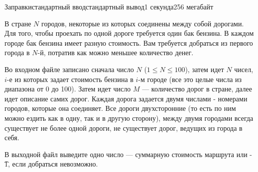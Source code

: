 \begin{problem}{Заправки}{стандартный ввод}{стандартный вывод}{1 секунда}{256 мегабайт}

В стране $N$ городов, некоторые из которых соединены между собой дорогами. Для того, чтобы проехать по одной дороге требуется один бак бензина. В каждом городе бак бензина имеет разную стоимость. Вам требуется добраться из первого города в $N$-й, потратив как можно меньшее количество денег. 

\InputFile
Во входном файле записано сначала число $N$ ($1 \le N \le 100$), затем идет $N$ чисел, $i$-е из которых задает стоимость бензина в $i$-м городе (все это целые числа из диапазона от 0 до 100). Затем идет число $M$ --- количество дорог в стране, далее идет описание самих дорог. Каждая дорога задается двумя числами - номерами городов, которые она соединяет. Все дороги двухсторонние (то есть по ним можно ездить как в одну, так и в другую сторону), между двумя городами всегда существует не более одной дороги, не существует дорог, ведущих из города в себя.

\OutputFile
В выходной файл выведите одно число --- суммарную стоимость маршрута или \t{-1}, если добраться невозможно. 

\Examples

\begin{example}
%
%
\end{example}

\end{problem}

